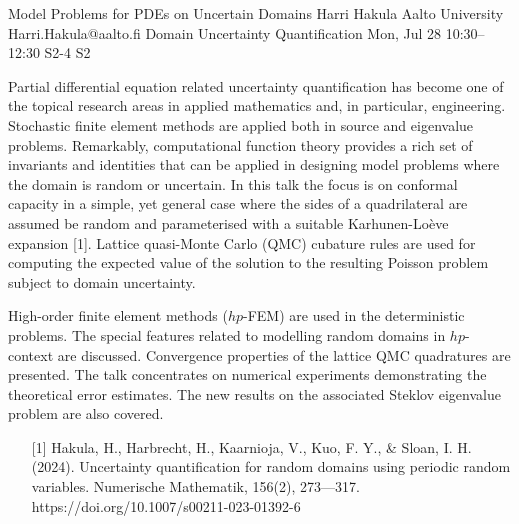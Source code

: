 \begin{talk}
  {Model Problems for PDEs on Uncertain Domains}%
  {Harri Hakula}%
  {Aalto University}%
  {Harri.Hakula@aalto.fi}%
  {Domain Uncertainty Quantification}%
  {}%
  {Mon, Jul 28 10:30–12:30}%
  {S2-4}%
  {S2}%
				
			
Partial differential equation related uncertainty quantification has become one of the
topical research areas in applied mathematics and, in particular, engineering.
Stochastic finite element methods are applied both in source and eigenvalue problems.
Remarkably, computational function theory provides a rich set of invariants 
and identities that
can be applied in designing model problems where the domain is random or uncertain. 
In this talk the focus is on conformal capacity in a simple, 
yet general case where the sides of a quadrilateral are assumed be random 
and parameterised with a suitable Karhunen-Loève expansion [1].
Lattice quasi-Monte Carlo (QMC) cubature rules are used for computing the expected value of the solution to the resulting Poisson problem subject to domain uncertainty. 

High-order finite element methods ($hp$-FEM) are used in the deterministic problems.
The special features related to modelling random domains in $hp$-context are discussed.
Convergence properties of the lattice QMC quadratures are presented. The talk
concentrates on numerical experiments demonstrating the theoretical error estimates.
The new results on the associated Steklov eigenvalue problem are also covered.


\medskip

\begin{enumerate}
	\item[{[1]}] Hakula, H., Harbrecht, H., Kaarnioja, V., Kuo, F. Y., \& Sloan, I. H. (2024). Uncertainty quantification for random domains using periodic random variables. Numerische Mathematik, 156(2), 273---317. https://doi.org/10.1007/s00211-023-01392-6
\end{enumerate}

\end{talk}

